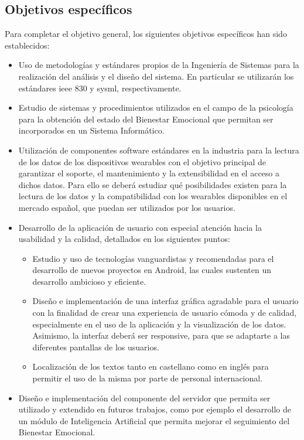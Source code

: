     \subsection{Objetivos específicos}
        Para completar el objetivo general, los siguientes objetivos específicos han sido establecidos:
        \begin{itemize}
            \item Uso de metodologías y estándares propios de la Ingeniería de Sistemas para la realización del análisis y el diseño del sistema. En particular se utilizarán los estándares \gls{ieee} 830 y \gls{sysml}, respectivamente.
            \item Estudio de sistemas y procedimientos utilizados en el campo de la psicología para la obtención del estado del Bienestar Emocional que permitan ser incorporados en un Sistema Informático.
            \item Utilización de componentes software estándares en la industria para la lectura de los datos de los dispositivos \glspl{wearable} con el objetivo principal de garantizar el soporte, el mantenimiento y la extensibilidad en el acceso a dichos datos. Para ello se deberá estudiar qué posibilidades existen para la lectura de los datos y la compatibilidad con los \glspl{wearable} disponibles en el mercado español, que puedan ser utilizados por los usuarios.
            \item Desarrollo de la aplicación de usuario con especial atención hacia la usabilidad y la calidad, detallados en los siguientes puntos:
            \begin{itemize}
                \item Estudio y uso de tecnologías vanguardistas y recomendadas para el desarrollo de nuevos proyectos en Android, las cuales sustenten un desarrollo ambicioso y eficiente.
                \item Diseño e implementación de una interfaz gráfica agradable para el usuario con la finalidad de crear una experiencia de usuario cómoda y de calidad, especialmente en el uso de la aplicación y la visualización de los datos. Asimismo, la interfaz deberá ser \gls{responsive}, para que se adaptarte a las diferentes pantallas de los usuarios.
                \item Localización de los textos tanto en castellano como en inglés para permitir el uso de la misma por parte de personal internacional.
            \end{itemize}
            \item Diseño e implementación del componente del servidor que permita ser utilizado y extendido en futuros trabajos, como por ejemplo el desarrollo de un módulo de Inteligencia Artificial que permita mejorar el seguimiento del Bienestar Emocional.
        \end{itemize}

